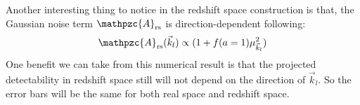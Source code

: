 \documentclass[prd,amsmath,amssymb,floatfix,superscriptaddress,nofootinbib,twocolumn]{revtex4-1}
\def\be{\begin{equation}}
\def\ee{\end{equation}}
\newcommand{\rs}{\rm rs}
\newcommand{\vk}{\vec{k}}
\begin{document}
Another interesting thing to notice in the redshift space construction is that, the Gaussian noise term $\mathpzc{A}_{\rs}$ is direction-dependent following:
\be 
\mathpzc{A}_{\rs}(\vk_l)\propto(1+f(a=1)\mu_{\vk_l}^{2})
\ee 
One benefit we can take from this numerical result is that the projected detectability in redshift space still will not depend on the direction of $\vk_l$. So the error bars will be the same for both real space and redshift space.

\clearpage 



\end{document}
